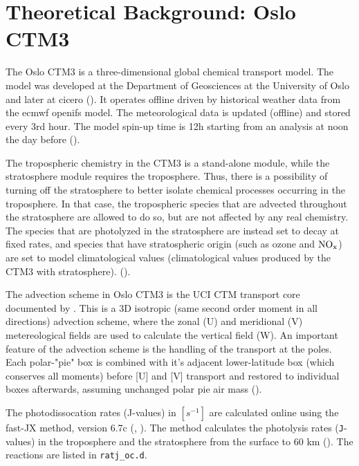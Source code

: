 \setcounter{chapter}{3}
\chapter{Theoretical Background: Oslo CTM3}\label{chapt:OsloCTM3}

The Oslo CTM3 is a three-dimensional global chemical transport model. The model was developed at the Department of Geosciences at the University of Oslo and later at \acrfull{cicero} (\cite{SovdeManual}). It operates offline driven by historical weather data from the \acrfull{ecmwf} \acrfull{openifs} model. The meteorological data is updated (offline) and stored every 3rd hour. The model spin-up time is 12h starting from an analysis at noon the day before (\cite{Sovde2012}). 

\medskip

The tropospheric chemistry in the CTM3 is a stand-alone module, while the stratosphere module requires the troposphere. Thus, there is a possibility of turning off the stratosphere to better isolate chemical processes occurring in the troposphere. In that case, the tropospheric species that are advected throughout the stratosphere are allowed to do so, but are not affected by any real chemistry. The species that are photolyzed in the stratosphere are instead set to decay at fixed rates, and species that have stratospheric origin (such as ozone and $\mathrm{NO_x}$) are set to model climatological values (climatological values produced by the CTM3 with stratosphere).  (\cite{Sovde2012}).

\medskip

The advection scheme in Oslo CTM3 is the UCI CTM transport core documented by \cite{Prather2008}. This is a 3D isotropic (same second order moment in all directions) advection scheme, where the zonal (U) and meridional (V) metereological fields are used to calculate the vertical field (W). An important feature of the advection scheme is the handling of the transport at the poles. Each polar-"pie" box is combined with it's adjacent lower-latitude box (which conserves all moments) before [U] and [V] transport and restored to individual boxes afterwards, assuming unchanged polar pie air mass (\cite{Sovde2012}). 


\medskip

The photodissocation rates (J-values) in $[s^{-1}]$ are calculated online using the fast-JX method, version 6.7c (\cite{FastJX}, \cite{SovdeManual}). The method calculates the photolysis rates (\texttt{J}-values) in the troposphere and the stratosphere from the surface to 60 km (\cite{Sovde2012}). The reactions are listed in \texttt{ratj\_oc.d}. 

